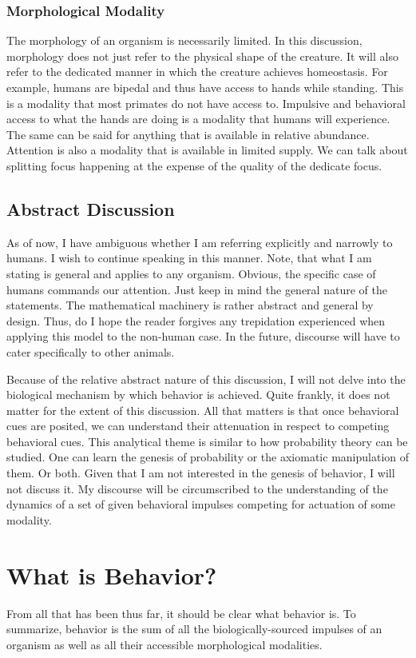 \documentclass[12pt]{article}
\begin{document}
\subsubsection{Morphological Modality}
The morphology of an organism is necessarily limited.
In this discussion, morphology does not just refer to the physical shape of the creature.
It will also refer to the dedicated manner in which the creature achieves homeostasis.
For example, humans are bipedal and thus have access to hands while standing.
This is a modality that most primates do not have access to.
Impulsive and behavioral access to what the hands are doing is a modality that humans will experience.
The same can be said for anything that is available in relative abundance.
Attention is also a modality that is available in limited supply.
We can talk about splitting focus happening at the expense of the quality of the dedicate focus.

\subsection{Abstract Discussion}
As of now, I have ambiguous whether I am referring explicitly and narrowly to humans.
I wish to continue speaking in this manner.
Note, that what I am stating is general and applies to any organism.
Obvious, the specific case of humans commands our attention.
Just keep in mind the general nature of the statements.
The mathematical machinery is rather abstract and general by design.
Thus, do I hope the reader forgives any trepidation experienced when applying this model to the non-human case.
In the future, discourse will have to cater specifically to other animals.

Because of the relative abstract nature of this discussion, I will not delve into the biological mechanism by which behavior is achieved.
Quite frankly, it does not matter for the extent of this discussion.
All that matters is that once behavioral cues are posited, we can understand their attenuation in respect to competing behavioral cues.
This analytical theme is similar to how probability theory can be studied.
One can learn the genesis of probability or the axiomatic manipulation of them.
Or both.
Given that I am not interested in the genesis of behavior, I will not discuss it.
My discourse will be circumscribed to the understanding of the dynamics of a set of given behavioral impulses competing for actuation of some modality.

\section{What is Behavior?}
From all that has been thus far, it should be clear what behavior is.
To summarize, behavior is the sum of all the biologically-sourced impulses of an organism as well as all their accessible morphological modalities.
\end{document}
